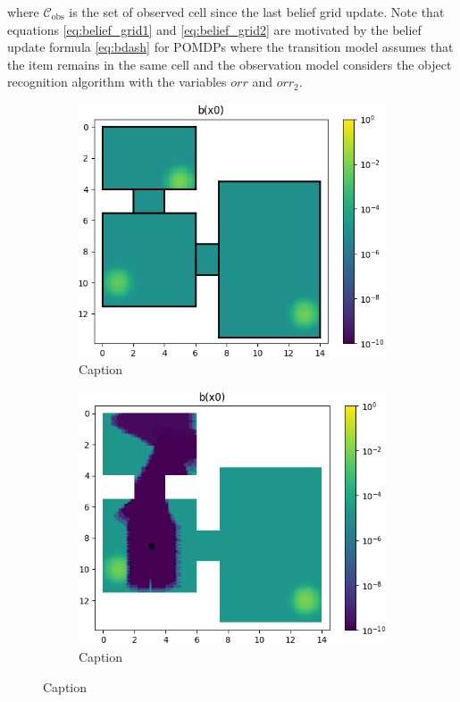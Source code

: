 %
where $\mathcal{C}_\text{obs}$ is the set of observed cell since the last belief grid update. Note that equations \ref{eq:belief_grid1} and \ref{eq:belief_grid2} are motivated by the belief update formula \ref{eq:bdash} for POMDPs where the transition model assumes that the item remains in the same cell and the observation model considers the object recognition algorithm with the variables $orr$ and $orr_2$. 
%
\begin{figure}
    \centering
    \begin{subfigure}[b]{0.48\textwidth}
        \includegraphics[width=\textwidth]{Report/images/belief_sc03.png}
        \caption{Caption}
        \label{subfig:b_sc03}
    \end{subfigure}
    \hfill
    \begin{subfigure}[b]{0.48\textwidth}
        \includegraphics[width=\textwidth]{Report/images/belief_sc03_observed.png}
        \caption{Caption}
        \label{subfig:b_sc03_observed}
    \end{subfigure}
    \caption{Caption}
    \label{fig:belief_grid}
\end{figure}
%
